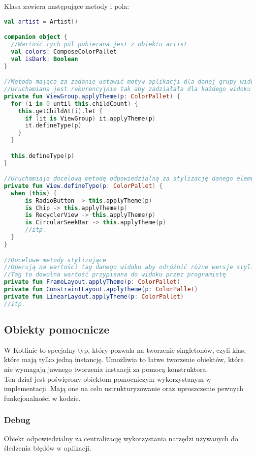 Klasa  zawiera następujące metody i pola:
\begin{lstlisting}[language=Kotlin]
val artist = Artist()

companion object {
  //Wartość tych pól pobierana jest z obiektu artist
  val colors: ComposeColorPallet
  val isDark: Boolean
}

//Metoda mająca za zadanie ustawić motyw aplikacji dla danej grupy widoków
//Uruchamiana jest rekurencyjnie tak aby zadziałała dla każdego widoku w drzewie
private fun ViewGroup.applyTheme(p: ColorPallet) {
  for (i in 0 until this.childCount) {
    this.getChildAt(i).let {
      if (it is ViewGroup) it.applyTheme(p)
      it.defineType(p)
    }
  }

  this.defineType(p)
}

//Uruchamiaja docelową metodę odpowiedzialną za stylizację danego elementu
private fun View.defineType(p: ColorPallet) {
  when (this) {
      is RadioButton -> this.applyTheme(p)
      is Chip -> this.applyTheme(p)
      is RecyclerView -> this.applyTheme(p)
      is CircularSeekBar -> this.applyTheme(p)
      //itp.
  }
}

//Docelowe metody stylizujące
//Operują na wartości tag danego widoku aby odróżnić różne wersje stylistyczne
//Tag to dowolna wartość przypisana do widoku przez programistę
private fun FrameLayout.applyTheme(p: ColorPallet)
private fun ConstraintLayout.applyTheme(p: ColorPallet)
private fun LinearLayout.applyTheme(p: ColorPallet)
//itp.

\end{lstlisting}

\newpage

\subsection{Obiekty pomocnicze}
W Kotlinie  to specjalny typ, który pozwala na tworzenie singletonów, czyli klas, które mają tylko jedną instancję. Umożliwia to łatwe tworzenie obiektów, które nie wymagają jawnego tworzenia instancji za pomocą konstruktora.\\

Ten dział jest poświęcony obiektom pomocniczym wykorzystanym w implementacji. Mają one na celu ustrukturyzowanie oraz uproszczenie pewnych funkcjonalności w kodzie.

\subsubsection{Debug}
Obiekt odpowiedzialny za centralizację wykorzystania narzędzi używanych do śledzenia błędów w aplikacji.


